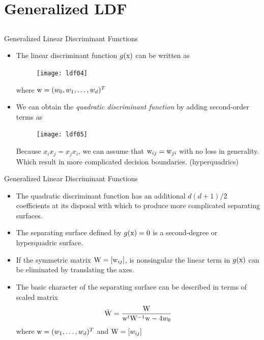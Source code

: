 \section{Generalized LDF}
\subsection{}
\begin{frame}{Generalized Linear Discriminant Functions}
\begin{itemize}
\item The linear discriminant function $g({\rm x})$ can be written as
\begin{figure}
\texttt{[image: ldf04]}
\end{figure}
where ${\rm w}=(w_0,w_1,\ldots,w_d)^T$
\item We can obtain the \textit{\color{slidecolor}quadratic discriminant function} by adding second-order terms as
\begin{figure}
\texttt{[image: ldf05]}
\end{figure}
Because $x_ix_j=x_jx_i$, we can assume that ${\rm w}_{ij}={\rm w}_{ji}$  with no loss in generality. Which result in more complicated decision boundaries.
(hyperquadrics)
\end{itemize}
\end{frame}

\begin{frame}{Generalized Linear Discriminant Functions}
\begin{itemize}
\item The quadratic discriminant function has an additional $d(d+1)/2$ coefficients at its disposal with which to produce more complicated separating surfaces.
\item The separating surface defined by $g({\rm x})=0$ is a second-degree or hyperquadric surface.
\item If the symmetric matrix ${\rm W} = [{\rm w}_{ij}]$, is nonsingular the linear term in $g({\rm x})$ can be eliminated by translating the axes. 
\item The basic character of the separating surface can be described in terms of scaled matrix
\begin{equation}
\bar{\rm W} = \frac{{\rm W}}{{{{\rm w}^t}{{\rm W}^{ - 1}}{\rm w} - 4{w_0}}} \nonumber
\end{equation}
where ${\rm w}=(w_1,\ldots,w_d)^T$ and ${\rm W}=[w_{ij}]$
\end{itemize}
\end{frame}

